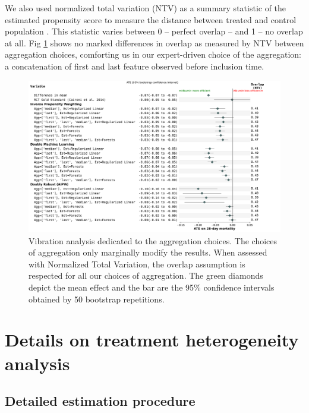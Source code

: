 \documentclass[french,12pt,twoside,a4paper]{book}
\begin{document}
\begin{appendices}
  We also used normalized total variation (NTV) as a summary statistic of the
  estimated propensity score to measure the distance between treated and control
  population \citep{doutreligne2023select}. This statistic varies between 0 --
  perfect overlap -- and 1 -- no overlap at all. Fig
  \ref{apd:fig:albumin_for_sepsis:vibration_analysis_for_aggregation} shows no
  marked differences in overlap as measured by NTV between aggregation choices,
  comforting us in our expert-driven choice of the aggregation: a concatenation
  of first and last feature observed before inclusion time.

  \begin{figure}[b!]
    \centering
    \includegraphics[width=1.0\linewidth]{img/chapter_4/sensitivity_feature_aggregation_albumin_for_sepsis__bs_50.pdf}
    \caption{Vibration analysis dedicated to the aggregation choices. The
      choices of aggregation only marginally modify the results. When assessed
      with Normalized Total Variation, the overlap assumption is respected for all
      our choices of aggregation. The green diamonds depict the mean effect and
      the bar are the 95\% confidence intervals obtained by 50 bootstrap
      repetitions.}\label{apd:fig:albumin_for_sepsis:vibration_analysis_for_aggregation}
  \end{figure}

  \section{Details on treatment heterogeneity analysis}\label{apd:hte}

  \subsection{Detailed estimation procedure}


\end{appendices}
\end{document}

